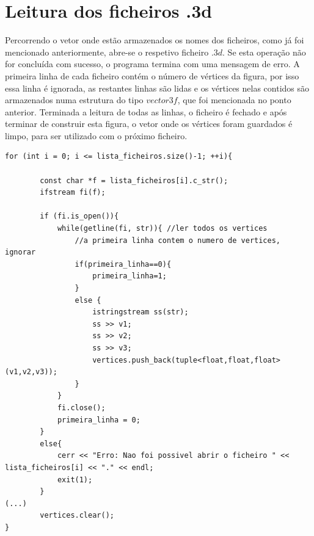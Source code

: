 \documentclass{report}
\begin{document}
\clearpage
\section{Leitura dos ficheiros .3d}
Percorrendo o vetor onde est\~ao armazenados os nomes dos ficheiros, como j\'a foi mencionado anteriormente, abre-se o respetivo ficheiro $.3d$. Se esta opera\c{c}\~ao n\~ao for conclu\'ida com sucesso, o programa termina com uma mensagem de erro. 
A primeira linha de cada ficheiro cont\'em o n\'umero de v\'ertices da figura, por isso essa linha \'e ignorada, as restantes linhas s\~ao lidas e os v\'ertices nelas contidos s\~ao armazenados numa estrutura do tipo $vector3f$, que foi mencionada no ponto anterior. Terminada a leitura de todas as linhas, o ficheiro \'e fechado e ap\'os terminar de construir esta figura, o vetor onde os v\'ertices foram guardados \'e limpo, para ser utilizado com o pr\'oximo ficheiro.
\\
\begin{lstlisting}[caption={Leitura dos ficheiros .3d},captionpos=b]
for (int i = 0; i <= lista_ficheiros.size()-1; ++i){

        const char *f = lista_ficheiros[i].c_str();
        ifstream fi(f);

        if (fi.is_open()){
            while(getline(fi, str)){ //ler todos os vertices
                //a primeira linha contem o numero de vertices, ignorar
                if(primeira_linha==0){ 
                    primeira_linha=1;
                } 
                else {
                    istringstream ss(str);
                    ss >> v1;
                    ss >> v2;
                    ss >> v3;
                    vertices.push_back(tuple<float,float,float>(v1,v2,v3));
                }
            }
            fi.close();
            primeira_linha = 0;
        }
        else{
            cerr << "Erro: Nao foi possivel abrir o ficheiro " << lista_ficheiros[i] << "." << endl;
            exit(1);
        }
(...)
        vertices.clear();
}
\end{lstlisting}

\clearpage
\end{document}

